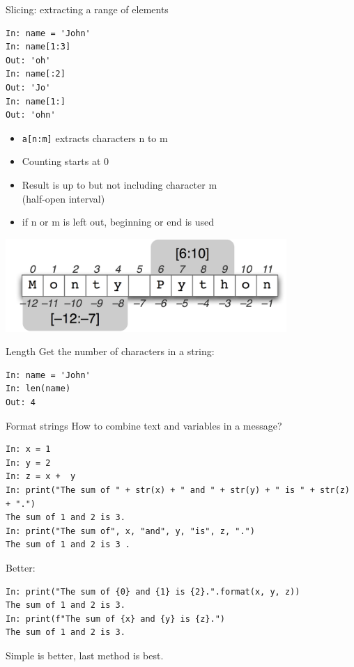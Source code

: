 \documentclass[aspectratio=169,usenames,dvipsnames]{beamer}
\begin{document}
\begin{frame}[fragile]{Slicing: extracting a range of elements}
\begin{lstlisting}
In: name = 'John'
In: name[1:3]
Out: 'oh'
In: name[:2]
Out: 'Jo'
In: name[1:]
Out: 'ohn'
\end{lstlisting}
    \begin{itemize}
        \item \texttt{a[n:m]} extracts characters n to m
        \item Counting starts at 0
        \item Result is up to but not including character m \\
                (half-open interval)
        \item if n or m is left out, beginning or end is used
    \end{itemize}
\end{frame}


\begin{frame}
    \includegraphics[width=0.8\textwidth]{fig/indexing}
\end{frame}

\begin{frame}[fragile]{Length}
Get the number of characters in a string:
\begin{lstlisting}
In: name = 'John'
In: len(name)
Out: 4
\end{lstlisting}
\end{frame}

\begin{frame}[fragile]{Format strings}
How to combine text and variables in a message?
\begin{lstlisting}
In: x = 1
In: y = 2
In: z = x +  y
In: print("The sum of " + str(x) + " and " + str(y) + " is " + str(z) + ".")
The sum of 1 and 2 is 3.
In: print("The sum of", x, "and", y, "is", z, ".")
The sum of 1 and 2 is 3 .
\end{lstlisting}

\pause
Better:
\begin{lstlisting}
In: print("The sum of {0} and {1} is {2}.".format(x, y, z))
The sum of 1 and 2 is 3.
In: print(f"The sum of {x} and {y} is {z}.")
The sum of 1 and 2 is 3.
\end{lstlisting}

Simple is better, last method is best.
\end{frame}
\end{document}
